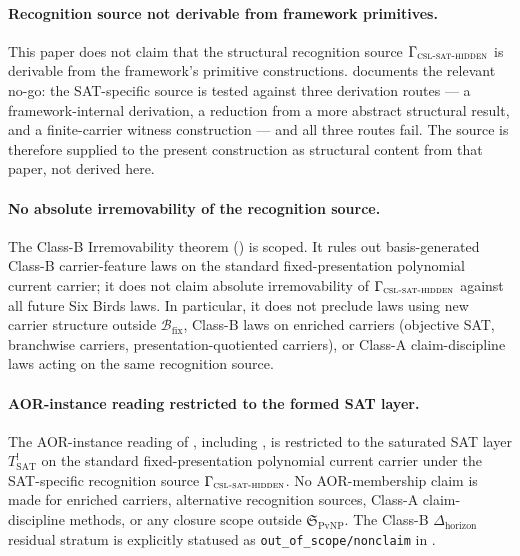 \documentclass[11pt]{article}
\newcommand{\Tsat}{T^{!}_{\mathrm{SAT}}}
\newcommand{\CSLSATHidden}{\Gamma_{\textsc{csl-sat-hidden}}}
\theoremstyle{definition}
\begin{document}
\paragraph{Recognition source not derivable from framework primitives.}
\label{nonclaim:pvnp:hiddenness-derivable}
This paper does not claim that the structural recognition source
\(\CSLSATHidden\) is derivable from the framework's primitive
constructions.  \citet{TsiokosHiddenness2026} documents the relevant
no-go: the SAT-specific source is tested against three derivation
routes — a framework-internal derivation, a reduction from a more
abstract structural result, and a finite-carrier witness construction
— and all three routes fail.  The source is therefore supplied to the
present construction as structural content from that paper, not derived
here.

\paragraph{No absolute irremovability of the recognition source.}
\label{nonclaim:pvnp:absolute-irremovability}
The Class-B Irremovability theorem
() is scoped.  It rules out
basis-generated Class-B carrier-feature laws on the standard
fixed-presentation polynomial current carrier; it does not claim
absolute irremovability of \(\CSLSATHidden\) against all future Six
Birds laws.  In particular, it does not preclude laws using new
carrier structure outside \(\mathcal B_{\mathrm{fix}}\), Class-B laws
on enriched carriers (objective SAT, branchwise carriers,
presentation-quotiented carriers), or Class-A claim-discipline laws
acting on the same recognition source.

\paragraph{AOR-instance reading restricted to the formed SAT layer.}
\label{nonclaim:pvnp:aor-instance-formed-layer-only}
The AOR-instance reading of , including
, is restricted to the saturated SAT
layer \(\Tsat\) on the standard fixed-presentation polynomial current
carrier under the SAT-specific recognition source
\(\CSLSATHidden\).  No AOR-membership claim is made for enriched
carriers, alternative recognition sources, Class-A claim-discipline
methods, or any closure scope outside \(\mathfrak S_{\mathrm{PvNP}}\).
The Class-B \(\Delta_{\mathrm{horizon}}\) residual stratum is
explicitly statused as \texttt{out\_of\_scope/nonclaim} in
.
\end{document}
